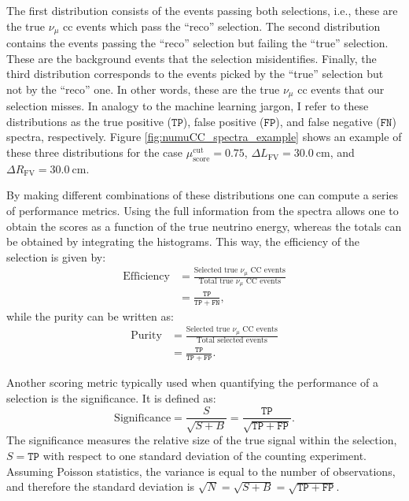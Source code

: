 The first distribution consists of the events passing both selections, i.e., these are the true $\nu_{\mu}$ \gls{cc} events which pass the ``reco'' selection. The second distribution contains the events passing the ``reco'' selection but failing the ``true'' selection. These are the background events that the selection misidentifies. Finally, the third distribution corresponds to the events picked by the ``true'' selection but not by the ``reco'' one. In other words, these are the true $\nu_{\mu}$ \gls{cc} events that our selection misses. In analogy to the machine learning jargon, I refer to these distributions as the true positive ($\mathtt{TP}$), false positive ($\mathtt{FP}$), and false negative ($\mathtt{FN}$) spectra, respectively. Figure \ref{fig:numuCC_spectra_example} shows an example of these three distributions for the case $\mu_{\mathrm{score}}^{\mathrm{cut}} = 0.75$, $\Delta L_{\mathrm{FV}} = 30.0 ~ \mathrm{cm}$, and $\Delta R_{\mathrm{FV}} = 30.0 ~ \mathrm{cm}$.

By making different combinations of these distributions one can compute a series of performance metrics. Using the full information from the spectra allows one to obtain the scores as a function of the true neutrino energy, whereas the totals can be obtained by integrating the histograms. This way, the efficiency of the selection is given by:
\begin{equation}
    \begin{split}
        \mathrm{Efficiency} &= \frac{\text{Selected true } \nu_{\mu} \text{ CC events}}{\text{Total true } \nu_{\mu} \text{ CC events}}\\
        &= \frac{\mathtt{TP}}{\mathtt{TP}+\mathtt{FN}},
    \end{split}
\end{equation}
while the purity can be written as:
\begin{equation}
    \begin{split}
        \mathrm{Purity} &= \frac{\text{Selected true } \nu_{\mu} \text{ CC events}}{\text{Total selected events}}\\
        &= \frac{\mathtt{TP}}{\mathtt{TP}+\mathtt{FP}}.
    \end{split}
\end{equation}

Another scoring metric typically used when quantifying the performance of a selection is the significance. It is defined as:
\begin{equation}
    \mathrm{Significance} = \frac{S}{\sqrt{S+B}} = \frac{\mathtt{TP}}{\sqrt{\mathtt{TP} + \mathtt{FP}}}.
\end{equation}
The significance measures the relative size of the true signal within the selection, $S=\mathtt{TP}$ with respect to one standard deviation of the counting experiment. Assuming Poisson statistics, the variance is equal to the number of observations, and therefore the standard deviation is $\sqrt{N}=\sqrt{S+B}=\sqrt{\mathtt{TP} + \mathtt{FP}}$.

